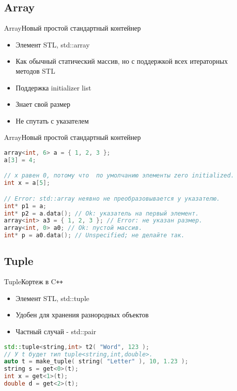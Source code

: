 \documentclass[10pt]{beamer}
\begin{document}
\subsection{Array}
\hypertarget{Array}{}
\begin{frame}[fragile]{Array}{Новый простой стандартный контейнер}
 \begin{itemize}
 \item{Элемент STL, std::array}
 \item{Как обычный статический массив, но с поддержкой всех итераторных методов STL}
 \item{Поддержка initializer list}
 \item{Знает свой размер}
 \item{Не спутать с указателем}
  \end{itemize}
\end{frame}

\begin{frame}[fragile]{Array}{Новый простой стандартный контейнер}
\begin{lstlisting}[language=C++]
array<int, 6> a = { 1, 2, 3 };
a[3] = 4;

// x равен 0, потому что  по умолчанию элементы zero initialized.
int x = a[5]; 

// Error: std::array неявно не преобразовывается у указателю.
int* p1 = a; 
int* p2 = a.data(); // Ok: указатель на первый элемент.
array<int> a3 = { 1, 2, 3 }; // Error: не указан размер.
array<int, 0> a0; // Ok: пустой массив.
int* p = a0.data(); // Unspecified; не делайте так.
\end{lstlisting}
\end{frame}


\subsection{Tuple}
\hypertarget{Tuple}{}
\begin{frame}[fragile]{Tuple}{Кортеж в C\texttt{++}}
\begin{itemize}
\item{Элемент STL, std::tuple}
 \item{Удобен для хранения разнородных объектов}
 \item{Частный случай - std::pair}
\end{itemize}
\vspace{5mm}
\begin{lstlisting}[language=C++]
std::tuple<string,int> t2( "Word", 123 );
// У t будет тип tuple<string,int,double>.
auto t = make_tuple( string( "Letter" ), 10, 1.23 );	
string s = get<0>(t);
int x = get<1>(t);
double d = get<2>(t);
\end{lstlisting}
\end{frame}
\end{document}
